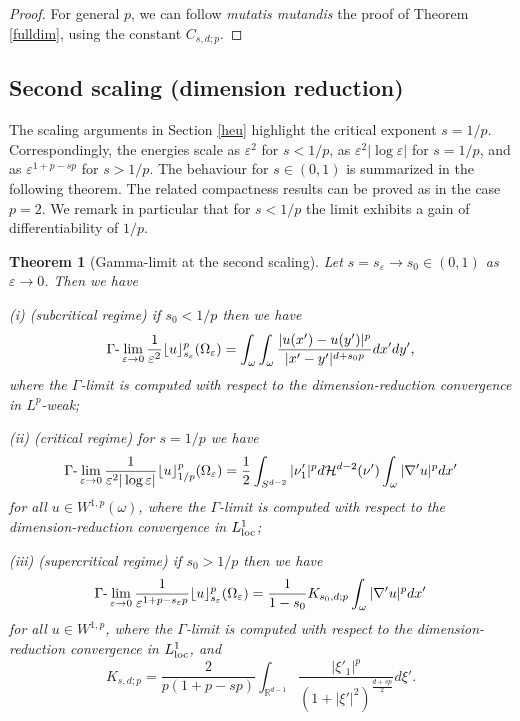 \documentclass[11pt]{article}
\newtheorem{theorem}[definition]{Theorem}
\def\e{\varepsilon}
\begin{document}
\begin{proof}
For general $p$, we can follow {\em mutatis mutandis} the proof of
Theorem \ref{fulldim}, using the constant 
$C_{s,d;p}$.
\end{proof}
\subsection{Second scaling (dimension reduction)}
The scaling arguments in Section \ref{heu} highlight the critical exponent $s=1/p$. Correspondingly, the energies scale as $\e^2$ for $s<1/p$, as $\e^2|\log\e|$ for $s=1/p$, and as $\e^{1+p-sp}$ for $s>1/p$.
The behaviour for $s\in(0,1)$ is  
summarized in the following theorem. 
The related compactness results can be proved as in the case $p=2$. We remark in particular that for $s<1/p$ the limit exhibits a gain of differentiability of $1/p$.

\begin{theorem}[Gamma-limit at the second scaling] Let $s=s_\e\to s_0\in(0,1)$ as $\e\to 0$. 
Then we have

{\rm(i) (subcritical regime)} if $s_0<1/p$ then we have
$$
\Gamma\hbox{-}\lim_{\e\to 0} \frac{1}{\e^{2}}\lfloor u\rfloor_{s_\e}^p(\Omega_\e)=
\int_\omega\int_\omega 
\frac{|u(x')-u(y')|^p}{|x'-y'|^{d+s_0 p}}dx' dy',
$$
where the $\Gamma$-limit is computed with respect to the dimension-reduction convergence in $L^p$-weak;

{\rm(ii) (critical regime)} for $s=1/p$ we have
$$
\Gamma\hbox{-}\lim_{\e\to 0} \frac{1}{\e^{2}|\log\e|}\lfloor u\rfloor_{1/p}^p(\Omega_\e)=\frac12\int_{S^{d-2}}|\nu'_1|^pd\mathcal H^{d-2}(\nu')\int_\omega |\nabla'u|^pdx'
$$
for all $u\in W^{1,p}(\omega)$, where the $\Gamma$-limit is computed with respect to the dimension-reduction convergence in $L^1_{\rm loc}$;


{\rm(iii) (supercritical regime)} if $s_0>1/p$ then we have
$$
\Gamma\hbox{-}\lim_{\e\to 0} \frac{1}{\e^{1+p-s_\e p}}\lfloor u\rfloor_{s_\e}^p(\Omega_\e)= \frac1{1-s_0} K_{s_0,d;p}\int_\omega |\nabla'u|^pdx'
$$
for all $u\in W^{1,p}$, where the $\Gamma$-limit is computed with respect to the dimension-reduction convergence in $L^1_{\rm loc}$, and
\begin{equation}
K_{s,d;p}=  \frac{2}{p(1+p-sp)} \int_{
 \mathbb R^{d-1}}\frac{|\xi'_1|^p}{(1+|\xi'|^2)^{\frac{d+sp}2}}d\xi'.
\end{equation}
\end{theorem}
\end{document}
